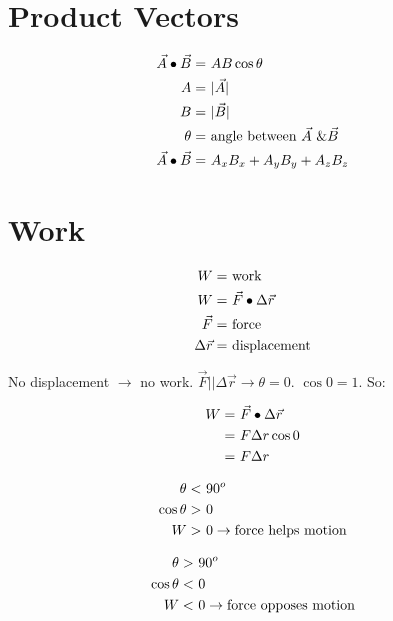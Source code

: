 \section{Product Vectors}

	\begin{align}
		\vec{A} \bullet \vec{B} = \ &AB \cos \theta& \notag \\
		A = \ &|\vec{A}|& \notag \\
		B = \ &|\vec{B}|& \notag \\
		\theta = \ &\text{angle between }\vec{A} \ \& \vec{B}& \notag \\
		\vec{A} \bullet \vec{B} = \ &A_{x}B_{x} + A_{y}B_{y} + A_{z}B_{z}& \notag
	\end{align}

\section{Work}

	\begin{align}
		W = \ &\text{work}& \notag \\
		W = \ &\vec{F} \bullet \Delta \vec{r}& \notag \\
		\vec{F} = \ &\text{force}& \notag \\
		\Delta \vec{r} = \ &\text{displacement}& \notag
	\end{align}

	No displacement $\to$ no work. $\vec{F} || \Delta \vec{r} \to \theta = 0$. $\cos 0 = 1$. So:

	\begin{align}
		W = \ &\vec{F} \bullet \Delta \vec{r}& \notag \\
		= \ &F \Delta r \cos 0& \notag \\
		= \ &F \Delta r& \notag
	\end{align}

	\begin{align}
		\theta < \ &90^{o}& \notag \\
		\cos \theta > \ &0& \notag \\
		W > \ &0 \to \text{force helps motion}& \notag
	\end{align}

	\begin{align}
		\theta > \ &90^{o}& \notag \\
		\cos \theta < \ &0& \notag \\
		W < \ &0 \to \text{force opposes motion}& \notag
	\end{align}

